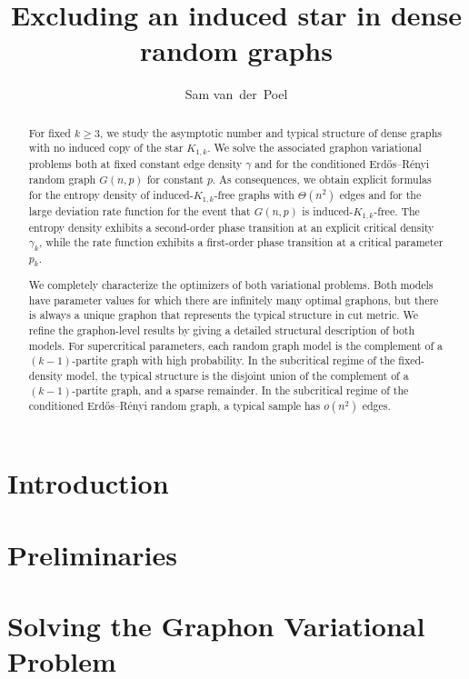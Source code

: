 \documentclass[11pt,letterpaper]{amsart}
\title[Excluding an induced star in dense random graphs]{Excluding an induced star in dense random graphs}
\author{Sam van~der~Poel}
\begin{document}
\begin{abstract}
For fixed $k\geq3$, we study the asymptotic number and typical structure of dense graphs with no induced copy of the star $K_{1,k}$. We solve the associated graphon variational problems both at fixed constant edge density $\gamma$ and for the conditioned Erd\H{o}s--R\'enyi random graph $G(n,p)$ for constant $p$. As consequences, we obtain explicit formulas for the entropy density of induced-$K_{1,k}$-free graphs with $\Theta(n^2)$ edges and for the large deviation rate function for the event that $G(n,p)$ is induced-$K_{1,k}$-free. The entropy density exhibits a second-order phase transition at an explicit critical density $\gamma_k$, while the rate function exhibits a first-order phase transition at a critical parameter $p_k$.

We completely characterize the optimizers of both variational problems. Both models have parameter values for which there are infinitely many optimal graphons, but there is always a unique graphon that represents the typical structure in cut metric. We refine the graphon-level results by giving a detailed structural description of both models. For supercritical parameters, each random graph model is the complement of a $(k-1)$-partite graph with high probability. In the subcritical regime of the fixed-density model, the typical structure is the disjoint union of the complement of a $(k-1)$-partite graph, and a sparse remainder. In the subcritical regime of the conditioned Erd\H{o}s--R\'enyi random graph, a typical sample has $o(n^2)$ edges.
\end{abstract}

\maketitle

\section{Introduction}
\label{sec:intro}


\section{Preliminaries}
\label{sec:prelim}


\section{Solving the Graphon Variational Problem}
\label{sec:graphon-prob}

\end{document}
